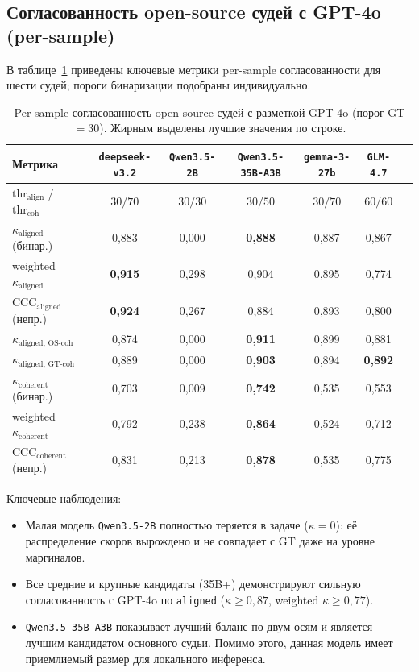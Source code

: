 \documentclass[a4paper,12pt]{extarticle}
\begin{document}
\subsection{Согласованность open-source судей с GPT-4o (per-sample)}

В таблице~\ref{tab:per_sample} приведены ключевые метрики per-sample согласованности для шести судей; пороги бинаризации подобраны индивидуально.

\begin{table}[ht]
\caption{Per-sample согласованность open-source судей с разметкой GPT-4o (порог GT $=30$). Жирным выделены лучшие значения по строке.}
\label{tab:per_sample}
\footnotesize
\centering
\begin{tabular}{lcccccc}
\toprule
\textbf{Метрика} & \texttt{deepseek-v3.2} & \texttt{Qwen3.5-2B} & \texttt{Qwen3.5-35B-A3B} & \texttt{gemma-3-27b} & \texttt{GLM-4.7} \\
\midrule
$\text{thr}_{\text{align}}$ / $\text{thr}_{\text{coh}}$ & $30/70$ &  $30/30$ & $30/50$ & $30/70$ & $60/60$ \\
$\kappa_{\text{aligned}}$ (бинар.)        & 0{,}883 & 0{,}000 & \textbf{0{,}888} & 0{,}887 & 0{,}867 \\
weighted $\kappa_{\text{aligned}}$        & \textbf{0{,}915} & 0{,}298 & 0{,}904 & 0{,}895 & 0{,}774 \\
$\mathrm{CCC}_{\text{aligned}}$ (непр.)   & \textbf{0{,}924} & 0{,}267 & 0{,}884 & 0{,}893 & 0{,}800 \\
$\kappa_{\text{aligned, OS-coh}}$         & 0{,}874 & 0{,}000 & \textbf{0{,}911} & 0{,}899 & 0{,}881 \\
$\kappa_{\text{aligned, GT-coh}}$         & 0{,}889 & 0{,}000 & \textbf{0{,}903} & 0{,}894 & \textbf{0{,}892} \\
$\kappa_{\text{coherent}}$ (бинар.)       & 0{,}703 & 0{,}009 & \textbf{0{,}742} & 0{,}535 & 0{,}553 \\
weighted $\kappa_{\text{coherent}}$       & 0{,}792 & 0{,}238 & \textbf{0{,}864} & 0{,}524 & 0{,}712 \\
$\mathrm{CCC}_{\text{coherent}}$ (непр.)  & 0{,}831 & 0{,}213 & \textbf{0{,}878} & 0{,}535 & 0{,}775 \\
\bottomrule
\end{tabular}
\end{table}

Ключевые наблюдения:
\begin{itemize}
    \item Малая модель \texttt{Qwen3.5-2B} полностью теряется в задаче ($\kappa = 0$): её распределение скоров вырождено и не совпадает с GT даже на уровне маргиналов.
    \item Все средние и крупные кандидаты (35B+) демонстрируют сильную согласованность с GPT-4o по \texttt{aligned} ($\kappa \ge 0{,}87$, weighted $\kappa \ge 0{,}77$).
    \item \texttt{Qwen3.5-35B-A3B} показывает лучший баланс по двум осям и является лучшим кандидатом основного судьи. Помимо этого, данная модель имеет приемлиемый размер для локального инференса.
\end{itemize}
\end{document}
